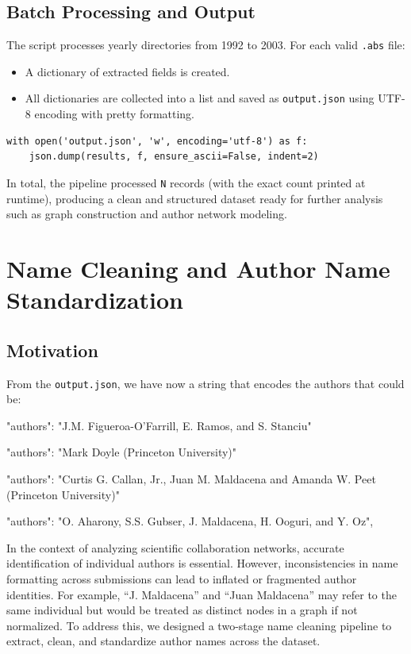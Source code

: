\documentclass[12pt]{article}
\begin{document}
\subsection{Batch Processing and Output}

The script processes yearly directories from 1992 to 2003. For each valid \texttt{.abs} file:
\begin{itemize}
    \item A dictionary of extracted fields is created.
    \item All dictionaries are collected into a list and saved as \texttt{output.json} using UTF-8 encoding with pretty formatting.
\end{itemize}






\begin{verbatim}
with open('output.json', 'w', encoding='utf-8') as f:
    json.dump(results, f, ensure_ascii=False, indent=2)
\end{verbatim}

In total, the pipeline processed \texttt{N} records (with the exact count printed at runtime), producing a clean and structured dataset ready for further analysis such as graph construction and author network modeling.

\section{Name Cleaning and Author Name Standardization}

\subsection{Motivation}
From the \texttt{output.json}, we have now a string that encodes the authors that could be:
\begin{tcolorbox}
"authors": "J.M. Figueroa-O'Farrill, E. Ramos, and S. Stanciu"

"authors": "Mark Doyle (Princeton University)"

"authors": "Curtis G. Callan, Jr., Juan M. Maldacena and Amanda W. Peet (Princeton University)"

"authors": "O. Aharony, S.S. Gubser, J. Maldacena, H. Ooguri, and Y. Oz",
\end{tcolorbox}


In the context of analyzing scientific collaboration networks, accurate identification of individual authors is essential. However, inconsistencies in name formatting across submissions can lead to inflated or fragmented author identities. For example, ``J. Maldacena'' and ``Juan Maldacena'' may refer to the same individual but would be treated as distinct nodes in a graph if not normalized. To address this, we designed a two-stage name cleaning pipeline to extract, clean, and standardize author names across the dataset.
\end{document}

